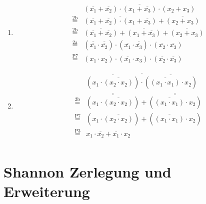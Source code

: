 \documentclass[DIN, pagenumber=false, fontsize=11pt, parskip=half]{scrartcl}
\begin{document}
    \subsection{}
    \begin{enumerate}
        \item
            \begin{eqnarray*}
                &&\overline{(\overline{x_1} + \overline{x_2}) \cdot (x_1 + \overline{x_3}) \cdot (x_2 + x_3)} \\
                &\stackrel{\text{2b}}{=}&  \overline{(\overline{x_1} + \overline{x_2}) \cdot (x_1 + \overline{x_3})} + \overline{(x_2 + x_3)}  \\
                &\stackrel{\text{2b}}{=}&  \overline{(\overline{x_1} + \overline{x_2})} + \overline{(x_1 + \overline{x_3})} + \overline{(x_2 + x_3)}  \\
                &\stackrel{\text{2a}}{=}&  (\overline{\overline{x_1}} \cdot \overline{\overline{x_2}}) \cdot 
                                        (\overline{x_1} \cdot  \overline{\overline{x_3}}) \cdot (\overline{x_2} \cdot \overline{x_3}) \\
                &\stackrel{\text{P7}}{=}& (x_1 \cdot x_2) \cdot (\overline{x_1} \cdot x_3) \cdot (\overline{x_2} \cdot \overline{x_3})
            \end{eqnarray*}
        \item
            \begin{eqnarray*}
                &&\overline{\overline{(x_1 \cdot \overline{(x_2 \cdot x_2)})} \cdot \overline{(\overline{(x_1 \cdot x_1)}\cdot x_2 )}} \\
                &\stackrel{\text{2b}}{=}& \overline{\overline{(x_1 \cdot \overline{(x_2 \cdot x_2)})}} + \overline{\overline{(\overline{(x_1 \cdot x_1)} \cdot x_2)}} \\
                &\stackrel{\text{P7}}{=}& (x_1 \cdot \overline{(x_2 \cdot x_2)}) + (\overline{(x_1 \cdot x_1)} \cdot x_2)\\
                &\stackrel{\text{P3}}{=}& x_1 \cdot \overline{x_2} + \overline{x_1} \cdot x_2\\
            \end{eqnarray*}
    \end{enumerate}

    \section{Shannon Zerlegung und Erweiterung}
    \setcounter{subsection}{4}
\end{document}

